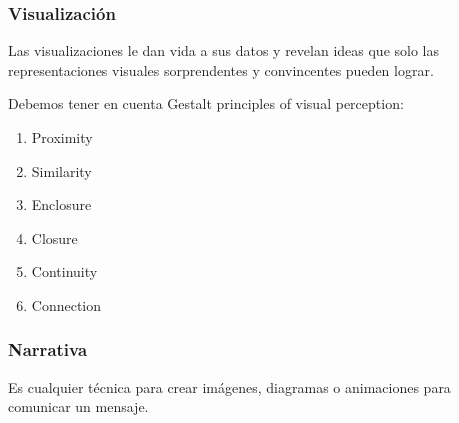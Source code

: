 \documentclass[11pt]{article}
\begin{document}
\subsubsection{Visualización}
Las visualizaciones le dan vida a sus datos y revelan ideas que solo las representaciones visuales sorprendentes y convincentes pueden lograr.

Debemos tener en cuenta Gestalt principles of visual perception:
\begin{enumerate}
    \item Proximity
    \item Similarity
    \item Enclosure
    \item Closure
    \item Continuity
    \item Connection
\end{enumerate}
\subsubsection{Narrativa}
Es cualquier técnica para crear imágenes, diagramas o animaciones para comunicar un mensaje.
\end{document}
